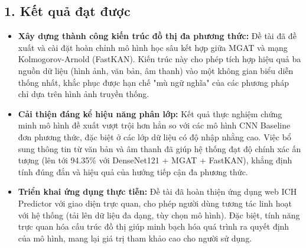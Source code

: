 \subsection{1. Kết quả đạt được}
\begin{itemize}[label={--}, itemsep=1pt]
    \item \textbf{Xây dựng thành công kiến trúc đồ thị đa phương thức:} Đề tài đã đề xuất và cài đặt hoàn chỉnh mô hình học sâu kết hợp giữa MGAT và mạng Kolmogorov-Arnold (FastKAN). Kiến trúc này cho phép tích hợp hiệu quả ba nguồn dữ liệu (hình ảnh, văn bản, âm thanh) vào một không gian biểu diễn thống nhất, khắc phục được hạn chế "mù ngữ nghĩa" của các phương pháp chỉ dựa trên hình ảnh truyền thống.
    
    \item \textbf{Cải thiện đáng kể hiệu năng phân lớp:} Kết quả thực nghiệm chứng minh mô hình đề xuất vượt trội hơn hẳn so với các mô hình CNN Baseline đơn phương thức, đặc biệt ở các lớp dữ liệu có độ nhập nhằng cao. Việc bổ sung thông tin từ văn bản và âm thanh đã giúp hệ thống đạt độ chính xác ấn tượng (lên tới 94.35\% với DenseNet121 + MGAT + FastKAN), khẳng định tính đúng đắn và hiệu quả của hướng tiếp cận đa phương thức.
    
    \item \textbf{Triển khai ứng dụng thực tiễn:} Đề tài đã hoàn thiện ứng dụng web ICH Predictor với giao diện trực quan, cho phép người dùng tương tác linh hoạt với hệ thống (tải lên dữ liệu đa dạng, tùy chọn mô hình). Đặc biệt, tính năng trực quan hóa cấu trúc đồ thị giúp minh bạch hóa quá trình ra quyết định của mô hình, mang lại giá trị tham khảo cao cho người sử dụng.
\end{itemize}